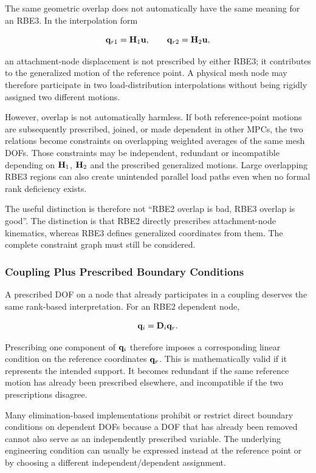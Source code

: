 The same geometric overlap does not automatically have the same meaning for an
RBE3. In the interpolation form

\begin{equation}
    \mathbf{q}_{r1}=\mathbf{H}_1\mathbf{u},
    \qquad
    \mathbf{q}_{r2}=\mathbf{H}_2\mathbf{u},
\end{equation}

an attachment-node displacement is not prescribed by either RBE3; it
contributes to the generalized motion of the reference point. A physical mesh
node may therefore participate in two load-distribution interpolations without
being rigidly assigned two different motions.

However, overlap is not automatically harmless. If both reference-point motions
are subsequently prescribed, joined, or made dependent in other MPCs, the two
relations become constraints on overlapping weighted averages of the same mesh
DOFs. Those constraints may be independent, redundant or incompatible depending
on $\mathbf{H}_1$, $\mathbf{H}_2$ and the prescribed generalized motions. Large overlapping
RBE3 regions can also create unintended parallel load paths even when no formal
rank deficiency exists.

The useful distinction is therefore not ``RBE2 overlap is bad, RBE3 overlap is
good''. The distinction is that RBE2 directly prescribes attachment-node
kinematics, whereas RBE3 defines generalized coordinates from them. The complete
constraint graph must still be considered.

\subsubsection{Coupling Plus Prescribed Boundary Conditions}

A prescribed DOF on a node that already participates in a coupling deserves the
same rank-based interpretation. For an RBE2 dependent node,

\begin{equation}
    \mathbf{q}_i=\mathbf{D}_i\mathbf{q}_r.
\end{equation}

Prescribing one component of $\mathbf{q}_i$ therefore imposes a corresponding linear
condition on the reference coordinates $\mathbf{q}_r$. This is mathematically valid
if it represents the intended support. It becomes redundant if the same
reference motion has already been prescribed elsewhere, and incompatible if the
two prescriptions disagree.

Many elimination-based implementations prohibit or restrict direct boundary
conditions on dependent DOFs because a DOF that has already been removed cannot
also serve as an independently prescribed variable. The underlying engineering
condition can usually be expressed instead at the reference point or by choosing
a different independent/dependent assignment.

